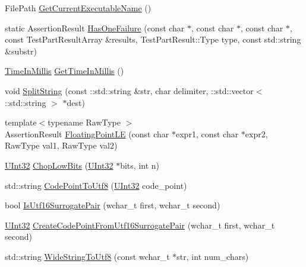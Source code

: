 \begin{DoxyCompactItemize}
\item 
File\+Path \mbox{\hyperlink{namespacetesting_1_1internal_a7a2bbf069f75bc99873976ad6fc356ad}{Get\+Current\+Executable\+Name}} ()
\item 
static Assertion\+Result \mbox{\hyperlink{namespacetesting_1_1internal_a4b5402183b934804ccaf61a4708f8e62}{Has\+One\+Failure}} (const char $\ast$, const char $\ast$, const char $\ast$, const Test\+Part\+Result\+Array \&results, Test\+Part\+Result\+::\+Type type, const std\+::string \&substr)
\item 
\mbox{\hyperlink{namespacetesting_1_1internal_a66a845df404b38fe85c5e14a069f255a}{Time\+In\+Millis}} \mbox{\hyperlink{namespacetesting_1_1internal_ae66b46943a429e6efb1db456d4cae90c}{Get\+Time\+In\+Millis}} ()
\item 
void \mbox{\hyperlink{namespacetesting_1_1internal_a8eb8eddf760375a490e007b20777ec56}{Split\+String}} (const \+::std\+::string \&str, char delimiter, \+::std\+::vector$<$ \+::std\+::string $>$ $\ast$dest)
\item 
{\footnotesize template$<$typename Raw\+Type $>$ }\\Assertion\+Result \mbox{\hyperlink{namespacetesting_1_1internal_a17b52b6b1f81f6dcad5cc4d12e5173a6}{Floating\+Point\+LE}} (const char $\ast$expr1, const char $\ast$expr2, Raw\+Type val1, Raw\+Type val2)
\item 
\mbox{\hyperlink{namespacetesting_1_1internal_a40d4fffcd2bf56f18b1c380615aa85e3}{U\+Int32}} \mbox{\hyperlink{namespacetesting_1_1internal_a2c54b453387aa8a18f2f3e09f10b5a7d}{Chop\+Low\+Bits}} (\mbox{\hyperlink{namespacetesting_1_1internal_a40d4fffcd2bf56f18b1c380615aa85e3}{U\+Int32}} $\ast$bits, int n)
\item 
std\+::string \mbox{\hyperlink{namespacetesting_1_1internal_a0c0f9558efb9abb965851c4738cdc725}{Code\+Point\+To\+Utf8}} (\mbox{\hyperlink{namespacetesting_1_1internal_a40d4fffcd2bf56f18b1c380615aa85e3}{U\+Int32}} code\+\_\+point)
\item 
bool \mbox{\hyperlink{namespacetesting_1_1internal_a681895f8cc32286211be9889da107394}{Is\+Utf16\+Surrogate\+Pair}} (wchar\+\_\+t first, wchar\+\_\+t second)
\item 
\mbox{\hyperlink{namespacetesting_1_1internal_a40d4fffcd2bf56f18b1c380615aa85e3}{U\+Int32}} \mbox{\hyperlink{namespacetesting_1_1internal_ac8ef1bb10cd9e69de939789b759e6bc9}{Create\+Code\+Point\+From\+Utf16\+Surrogate\+Pair}} (wchar\+\_\+t first, wchar\+\_\+t second)
\item 
std\+::string \mbox{\hyperlink{namespacetesting_1_1internal_a05b8c86ff38243f34d8f839a0eadefb1}{Wide\+String\+To\+Utf8}} (const wchar\+\_\+t $\ast$str, int num\+\_\+chars)

\end{DoxyCompactItemize}
